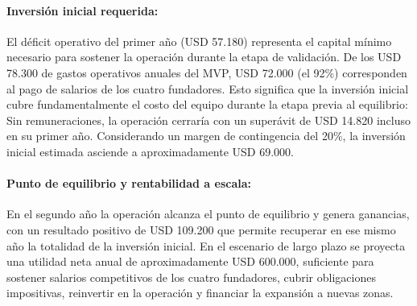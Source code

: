 \paragraph{Inversión inicial requerida:}
El déficit operativo del primer año (USD 57.180) representa el capital mínimo necesario para sostener la operación durante la etapa de validación. De los USD 78.300 de gastos operativos anuales del MVP, USD 72.000 (el 92\%) corresponden al pago de salarios de los cuatro fundadores. Esto significa que la inversión inicial cubre fundamentalmente el costo del equipo durante la etapa previa al equilibrio: Sin remuneraciones, la operación cerraría con un superávit de USD 14.820 incluso en su primer año. Considerando un margen de contingencia del 20\%, la inversión inicial estimada asciende a aproximadamente USD 69.000.

\paragraph{Punto de equilibrio y rentabilidad a escala:}
En el segundo año la operación alcanza el punto de equilibrio y genera ganancias, con un resultado positivo de USD 109.200 que permite recuperar en ese mismo año la totalidad de la inversión inicial. En el escenario de largo plazo se proyecta una utilidad neta anual de aproximadamente USD 600.000, suficiente para sostener salarios competitivos de los cuatro fundadores, cubrir obligaciones impositivas, reinvertir en la operación y financiar la expansión a nuevas zonas.
